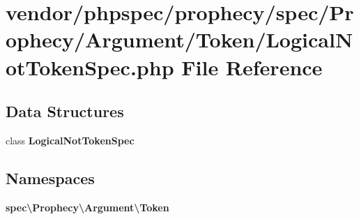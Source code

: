 \section{vendor/phpspec/prophecy/spec/\+Prophecy/\+Argument/\+Token/\+Logical\+Not\+Token\+Spec.php File Reference}
\label{_logical_not_token_spec_8php}
\subsection*{Data Structures}
\begin{DoxyCompactItemize}
\item 
class {\bf Logical\+Not\+Token\+Spec}
\end{DoxyCompactItemize}
\subsection*{Namespaces}
\begin{DoxyCompactItemize}
\item 
 {\bf spec\textbackslash{}\+Prophecy\textbackslash{}\+Argument\textbackslash{}\+Token}
\end{DoxyCompactItemize}
